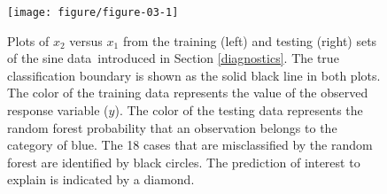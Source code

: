 \documentclass[AMS,STIX2COL]{WileyNJD-v2}\usepackage[]{graphicx}\usepackage[]{color}
\newenvironment{knitrout}{}{} %
\newcommand{\data}{sine data}
\begin{document}
\begin{figure}[!thp]
\centering
\begin{knitrout}
\color{fgcolor}

{\centering \texttt{[image: figure/figure-03-1]} 

}



\end{knitrout}
\caption{Plots of $x_2$ versus $x_1$ from the training (left) and testing (right) sets of the \data \ introduced in Section \ref{diagnostics}. The true classification boundary is shown as the solid black line in both plots. The color of the training data  represents the value of the observed response variable ($y$). The color of the testing data  represents the random forest probability that an observation belongs to the category of blue. The 18 cases that are misclassified by the random forest are identified by black circles. The prediction of interest to explain is indicated by a diamond.}
\label{fig:figure-03}
\end{figure}
\end{document}
